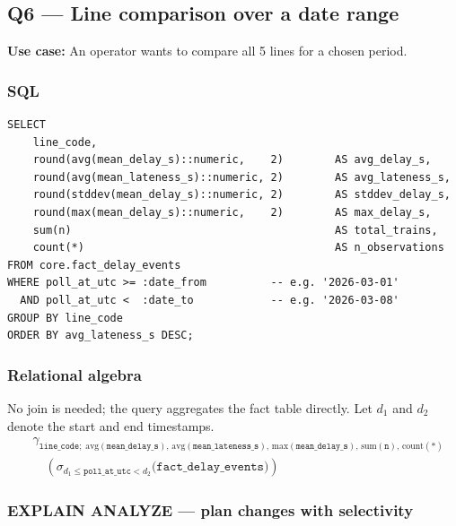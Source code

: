 \documentclass[a4paper,11pt]{article}
\begin{document}
\subsection{Q6 --- Line comparison over a date range}

\textbf{Use case:} An operator wants to compare all 5 lines for a chosen period.

\subsubsection{SQL}

\begin{lstlisting}[style=sql, caption={Q6 --- line comparison
  (\texttt{sql/queries/q6\_line\_comparison\_date\_range.sql}).}]
SELECT
    line_code,
    round(avg(mean_delay_s)::numeric,    2)        AS avg_delay_s,
    round(avg(mean_lateness_s)::numeric, 2)        AS avg_lateness_s,
    round(stddev(mean_delay_s)::numeric, 2)        AS stddev_delay_s,
    round(max(mean_delay_s)::numeric,    2)        AS max_delay_s,
    sum(n)                                         AS total_trains,
    count(*)                                       AS n_observations
FROM core.fact_delay_events
WHERE poll_at_utc >= :date_from          -- e.g. '2026-03-01'
  AND poll_at_utc <  :date_to            -- e.g. '2026-03-08'
GROUP BY line_code
ORDER BY avg_lateness_s DESC;
\end{lstlisting}

\subsubsection{Relational algebra}

No join is needed; the query aggregates the fact table directly.
Let $d_1$ and $d_2$ denote the start and end timestamps.
\begin{align*}
  &\gamma_{\texttt{line\_code};\;
    \text{avg}(\texttt{mean\_delay\_s}),\,\text{avg}(\texttt{mean\_lateness\_s}),\,
    \text{max}(\texttt{mean\_delay\_s}),\,\text{sum}(\texttt{n}),\,\text{count}(*)} \\
  &\quad\left(
    \sigma_{d_1 \leq \texttt{poll\_at\_utc} < d_2}
    \bigl(\texttt{fact\_delay\_events}\bigr)
  \right)
\end{align*}

\subsubsection{EXPLAIN ANALYZE --- plan changes with selectivity}
\end{document}
